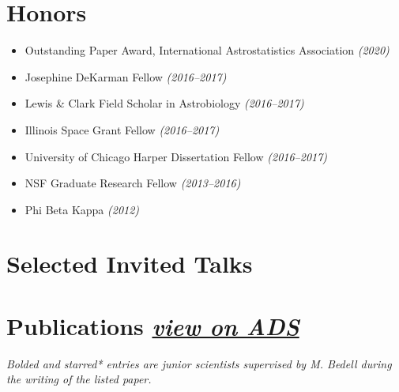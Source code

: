 \documentclass{clean_cv}
\begin{document}
\section{Honors}

\begin{itemize}
    \item Outstanding Paper Award, International Astrostatistics Association \textit{(2020)}
    \item Josephine DeKarman Fellow \textit{(2016--2017)}
    \item Lewis \& Clark Field Scholar in Astrobiology \textit{(2016--2017)}
    \item Illinois Space Grant Fellow \textit{(2016--2017)}
    \item University of Chicago Harper Dissertation Fellow \textit{(2016--2017)}
    \item NSF Graduate Research Fellow \textit{(2013--2016)}
    \item Phi Beta Kappa \textit{(2012)}
\end{itemize}

\section{Selected Invited Talks}

\newpage
\section{Publications \hfill \textit{\href{https://ui.adsabs.harvard.edu/public-libraries/azGh82kST26WzcBhHOVhAw}{view on ADS}}}

\textit{Bolded and starred* entries are junior scientists supervised by M. Bedell during the writing of the listed paper.}
\vspace{2mm}

\begin{itemize}
    
\end{itemize}
\end{document}

